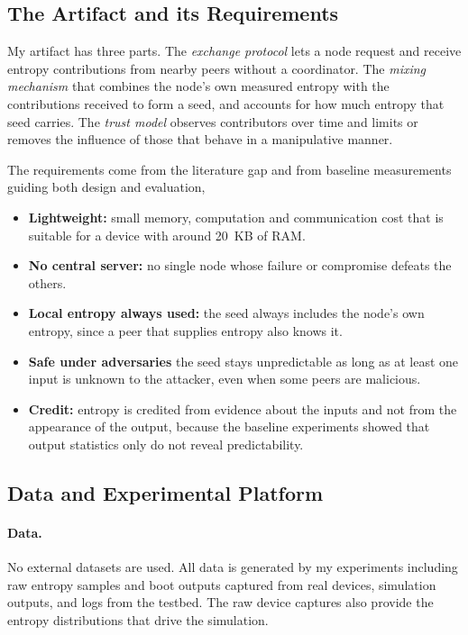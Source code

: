 \documentclass[a4paper, 12pt]{article}
\begin{document}
\subsection{The Artifact and its Requirements}
 
My artifact has three parts. The \emph{exchange protocol} lets a node request and receive entropy contributions from nearby peers without a coordinator. The \emph{mixing mechanism} that combines the node's own measured entropy with the contributions received to form a seed, and accounts for how much entropy that seed carries. The \emph{trust model} observes contributors over time and limits or removes the influence of those that behave in a manipulative manner.
 
The requirements come from the literature gap and from baseline measurements guiding both design and evaluation,
\begin{itemize}
    \item \textbf{Lightweight:} small memory, computation and communication cost that is suitable for a device with around 20~KB of RAM.
    \item \textbf{No central server:} no single node whose failure or compromise defeats the others.
    \item \textbf{Local entropy always used:} the seed always includes the node's own entropy, since a peer that supplies entropy also knows it.
    \item \textbf{Safe under adversaries} the seed stays unpredictable as long as at least one input is unknown to the attacker, even when some peers are malicious.
    \item \textbf{Credit:} entropy is credited from evidence about the inputs and not from the appearance of the output, because the baseline experiments showed that output statistics only do not reveal predictability.
\end{itemize}
 
\subsection{Data and Experimental Platform}
 
\paragraph{Data.} No external datasets are used. All data is generated by my experiments including raw entropy samples and boot outputs captured from real devices, simulation outputs, and logs from the testbed. The raw device captures also provide the entropy distributions that drive the simulation.
 
\end{document}
